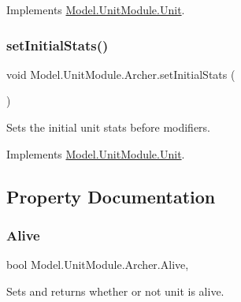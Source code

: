 Implements \hyperlink{interface_model_1_1_unit_module_1_1_unit_ad48776b3bd231bf80d2eec87b7498302}{Model.\+Unit\+Module.\+Unit}.

\hypertarget{class_model_1_1_unit_module_1_1_archer_acd305143313040a061b7482039c7a9b6}{}\label{class_model_1_1_unit_module_1_1_archer_acd305143313040a061b7482039c7a9b6} 
\subsubsection{\texorpdfstring{set\+Initial\+Stats()}{setInitialStats()}}
{\footnotesize\ttfamily void Model.\+Unit\+Module.\+Archer.\+set\+Initial\+Stats (\begin{DoxyParamCaption}{ }\end{DoxyParamCaption})\hspace{0.3cm}{\ttfamily [inline]}}

Sets the initial unit stats before modifiers. 

Implements \hyperlink{interface_model_1_1_unit_module_1_1_unit_a3b67c1b9e929a9f7d4191de20996220a}{Model.\+Unit\+Module.\+Unit}.



\subsection{Property Documentation}
\hypertarget{class_model_1_1_unit_module_1_1_archer_a20bece941fa5cf234326fb10d09f92e0}{}\label{class_model_1_1_unit_module_1_1_archer_a20bece941fa5cf234326fb10d09f92e0} 
\subsubsection{\texorpdfstring{Alive}{Alive}}
{\footnotesize\ttfamily bool Model.\+Unit\+Module.\+Archer.\+Alive\hspace{0.3cm}{\ttfamily [get]}, {\ttfamily [set]}}

Sets and returns whether or not unit is alive. \hypertarget{class_model_1_1_unit_module_1_1_archer_adfb64d60ccce91e614bdbf834feff655}{}\label{class_model_1_1_unit_module_1_1_archer_adfb64d60ccce91e614bdbf834feff655} 
